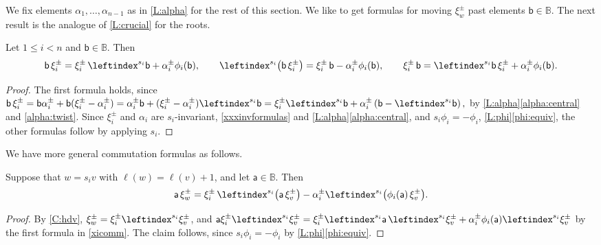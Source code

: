 \documentclass[a4paper,11pt]{amsart}
\numberwithin{equation}{subsection}
\theoremstyle{definition}
\theoremstyle{theorem}
\theoremstyle{remark}
\newcommand\xipm{\xi^\pm}
\newcommand\ba{\mathsf{a}}
\newcommand\bb{\mathsf{b}}
\newcommand{\Bo}{\mathbb{B}}
\begin{document}
We fix elements $\alpha_1,\dots,\alpha_{n-1}$ as in \autoref{L:alpha} for the rest of this section.
We like to get formulas for moving $\xi^\pm_w$ past elements $\bb\in\Bo$. The next result is the analogue of \autoref{L:crucial} for the roots.

\begin{Lemma}\label{L:xicomm}
  Let $1\le i<n$ and $\bb\in\Bo$. Then
  \begin{equation}\label{xicomm}
    \bb\,\xipm_i=\xipm_i\,\leftindex^{s_i}\bb+\alpha^\pm_i\phi_i(\bb),
    \qquad
    \leftindex^{s_i}{\left(\bb\,\xipm_i\right)}=\xipm_i\,\bb-\alpha^\pm_i\phi_i(\bb),
        \qquad
      \xipm_i\,\bb=\leftindex^{s_i}\bb\,\xipm_i+\alpha^\pm_i\phi_i(\bb).
  \end{equation}
\end{Lemma}

\begin{proof}
   The first formula holds, since
$\bb\,\xipm_i=\bb\alpha^\pm_i+\bb(\xipm_i-\alpha^\pm_i)
      =\alpha^\pm_i\bb+(\xipm_i-\alpha^\pm_i)\leftindex^{s_i}\bb
      =\xipm_i\leftindex^{s_i}\bb+\alpha^\pm_i\left(\bb-\leftindex^{s_i}\bb\right),
 $
   by \autoref{L:alpha}\autoref{alpha:central} and \autoref{alpha:twist}. Since $\xipm_i$ and $\alpha_i$ are $s_i$-invariant,  \autoref{xxxinvformulas} and  \autoref{L:alpha}\autoref{alpha:central}, and $s_i\phi_i=-\phi_i$, \autoref{L:phi}\autoref{phi:equiv}, the other formulas follow by applying $s_i$.
\end{proof}
We have more general commutation formulas as follows.
 \begin{Lemma}\label{L:axirec}
   Suppose that $w=s_iv$ with $\ell(w)=\ell(v)+1$, and let $\ba\in\Bo$. Then
   \[
     \ba\,\xipm_w
       =\xipm_i\,\leftindex^{s_i}{\left(\ba\,\xipm_v\right)}
        -\alpha^\pm_i\leftindex^{s_i}{\left(\phi_i(\ba)\,\xipm_v\right)}.
   \]
 \end{Lemma}

 \begin{proof}
   By \autoref{C:hdv}, $\xipm_w=\xipm_i\leftindex^{s_i}{{\xipm_v}}$, and  $\ba\xipm_i\leftindex^{s_i}{{\xipm_v}}
    =\xipm_i\leftindex^{s_i}\ba\,\leftindex^{s_i}{{\xipm_v}}
     +\alpha_i^\pm\phi_i(\ba)\leftindex^{s_i}{{\xipm_v}}$ by the first
   formula in \autoref{xicomm}.
   The claim follows, since $s_i\phi_i=-\phi_i$ by \autoref{L:phi}\autoref{phi:equiv}.
 \end{proof}
\end{document}
